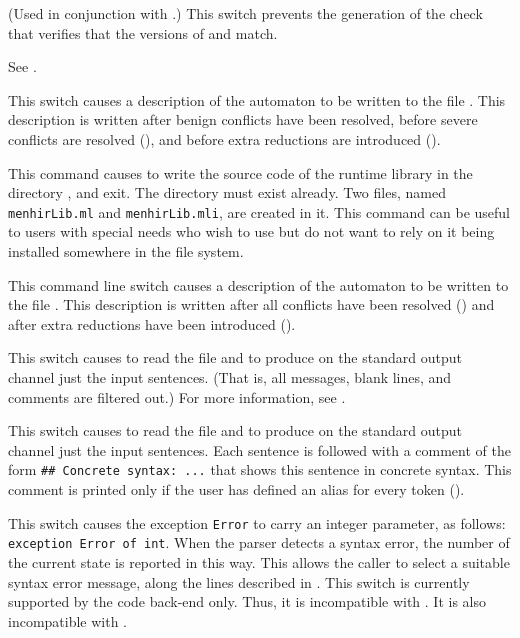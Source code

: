 \documentclass[onecolumn,11pt,nocopyrightspace,preprint]{sigplanconf}
\begin{document}
\docswitch{\orocqnoversioncheck} (Used in conjunction with \orocq.) This switch
prevents the generation of the check that verifies that the versions of
\menhir and \rocqmenhirlib match.

\docswitch{\odepend} See .

\docswitch{\odump} This switch causes a description of the automaton to be
written to the file \automaton. This description is written after
benign conflicts have been resolved, before severe conflicts are resolved
(), and before extra reductions are introduced
().

 This command causes \menhir to
write the source code of the runtime library \menhirlib in the directory
, and exit. The directory  must exist already. Two
files, named \texttt{menhirLib.ml} and \texttt{menhirLib.mli}, are created in
it. This command can be useful to users with special needs who wish to use
\menhirlib but do not want to rely on it being installed somewhere in the file
system.

\docswitch{\odumpresolved} This command line switch causes a description of
the automaton to be written to the file \automatonresolved. This
description is written after all conflicts have been resolved
() and after extra reductions have been introduced
().

 This switch causes \menhir to
read the \messages file  and to produce on the standard output
channel just the input sentences. (That is, all messages, blank lines, and
comments are filtered out.) For more information, see .

 This switch causes \menhir to
read the \messages file  and to produce on the standard output
channel just the input sentences. Each sentence is followed with a comment of
the form \verb+## Concrete syntax: ...+ that shows this sentence in concrete
syntax. This comment is printed only if the user has defined an alias for
every token ().

\docswitch{\oexncarriesstate} This switch causes the exception \texttt{Error}
to carry an integer parameter, as follows: \texttt{exception Error of int}.
When the parser detects a syntax error, the number of the current state is
reported in this way. This allows the caller to select a suitable syntax error
message, along the lines described in . This switch is
currently supported by the code back-end only. Thus, it is incompatible
with \otable. It is also incompatible with \ofixedexc.
\end{document}
